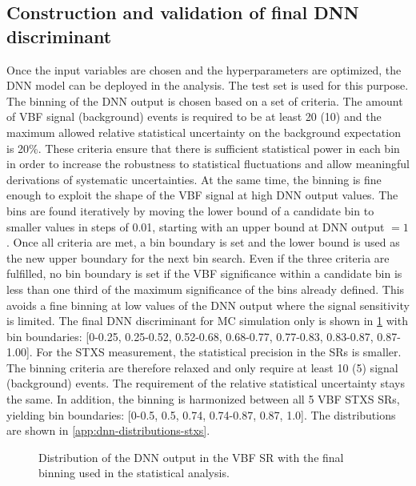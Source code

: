 \subsection{Construction and validation of final DNN discriminant}
\label{subsec:fina-model-validation}
Once the input variables are chosen and the hyperparameters are optimized, the DNN model can be deployed in the analysis. The test set is used for this purpose.
The binning of the DNN output is chosen based on a set of criteria.
The amount of VBF signal (background) events is required to be at least 20 (10) and the maximum allowed relative statistical uncertainty on the background expectation is 20\%.
These criteria ensure that there is sufficient statistical power in each bin in order to increase the robustness to statistical fluctuations and allow meaningful derivations of systematic uncertainties. At the same time, the binning is fine enough to exploit the shape of the VBF signal at high DNN output values.
The bins are found iteratively by moving the lower bound of a candidate bin to smaller values in steps of 0.01, starting with an upper bound at DNN output $= 1$. Once all criteria are met, a bin boundary is set and the lower bound is used as the new upper boundary for the next bin search. Even if the three criteria are fulfilled, no bin boundary is set if the VBF significance within a candidate bin is less than one third of the maximum significance of the bins already defined. This avoids a fine binning at low values of the DNN output where the signal sensitivity is limited.
The final DNN discriminant for MC simulation only is shown in \cref{fig:dnn:blinded-fit-binning} with bin boundaries: [0-0.25, 0.25-0.52, 0.52-0.68, 0.68-0.77, 0.77-0.83, 0.83-0.87, 0.87-1.00].
For the STXS measurement, the statistical precision in the SRs is smaller. The binning criteria are therefore relaxed and only require at least 10 (5) signal (background) events. The requirement of the relative statistical uncertainty stays the same. In addition, the binning is harmonized between all 5 VBF STXS SRs, yielding bin boundaries: [0-0.5, 0.5, 0.74, 0.74-0.87, 0.87, 1.0]. The distributions are shown in \cref{app:dnn-distributions-stxs}.

\begin{figure}[th]
    \centering
    {\caption{Distribution of the DNN output in the VBF SR with the final binning used in the statistical analysis.
            \label{fig:dnn:blinded-fit-binning} }}
\end{figure}

